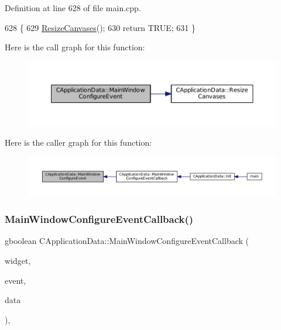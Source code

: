 Definition at line 628 of file main.\+cpp.


\begin{DoxyCode}
628                                                                                      \{
629     \hyperlink{classCApplicationData_ad8b16ccb099b4996ce9fee34a407c091}{ResizeCanvases}();
630     \textcolor{keywordflow}{return} TRUE;
631 \}
\end{DoxyCode}
Here is the call graph for this function\+:\nopagebreak
\begin{figure}[H]
\begin{center}
\leavevmode
\includegraphics[width=350pt]{classCApplicationData_a7abef8a548d0ad3adb70f11d8a74176c_cgraph}
\end{center}
\end{figure}
Here is the caller graph for this function\+:\nopagebreak
\begin{figure}[H]
\begin{center}
\leavevmode
\includegraphics[width=350pt]{classCApplicationData_a7abef8a548d0ad3adb70f11d8a74176c_icgraph}
\end{center}
\end{figure}
\hypertarget{classCApplicationData_a31b48405b43d73cabca4c080c1b9beee}{}\label{classCApplicationData_a31b48405b43d73cabca4c080c1b9beee} 
\subsubsection{\texorpdfstring{Main\+Window\+Configure\+Event\+Callback()}{MainWindowConfigureEventCallback()}}
{\footnotesize\ttfamily gboolean C\+Application\+Data\+::\+Main\+Window\+Configure\+Event\+Callback (\begin{DoxyParamCaption}\item[{Gtk\+Widget $\ast$}]{widget,  }\item[{Gdk\+Event $\ast$}]{event,  }\item[{gpointer}]{data }\end{DoxyParamCaption})\hspace{0.3cm}{\ttfamily [static]}, {\ttfamily [protected]}}



